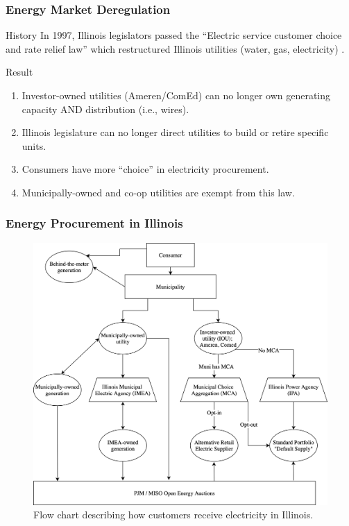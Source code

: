\begin{frame}
    \frametitle{Energy Market Deregulation}
    \begin{block}{History}
        In 1997, Illinois legislators passed the ``Electric service customer choice and rate relief law''
        which restructured Illinois utilities (water, gas, electricity) \cite{illinois_90th_general_assembly_electric_1997}.
    \end{block}
    \pause
    \begin{block}{Result}
        \begin{enumerate}[<+->]
            \item Investor-owned utilities (Ameren/ComEd) can no longer own generating capacity AND distribution (i.e., wires).
            \item Illinois legislature can no longer direct utilities to build or retire specific units.
            \item Consumers have more ``choice'' in electricity procurement.
            \item Municipally-owned and co-op utilities are exempt from this law.
        \end{enumerate}
    \end{block}
\end{frame}

\begin{frame}
    \frametitle{Energy Procurement in Illinois}
    \begin{figure}
        \centering
        \includegraphics[height=0.8\textheight]{../docs/figures/07_interview_chapter/illinois-electric-choice.png}
        \caption{Flow chart describing how customers receive electricity in Illinois.}
        \label{fig:illinois-flow-chart}
    \end{figure}
\end{frame}

